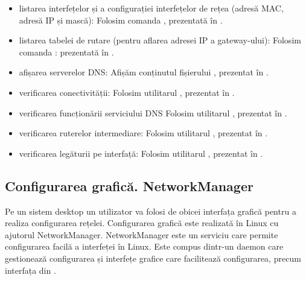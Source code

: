 \begin{itemize}
  \item listarea interfețelor și a configurației interfețelor de rețea (adresă MAC, adresă IP și mască):
    Folosim comanda , prezentată în .
  \item listarea tabelei de rutare (pentru aflarea adresei IP a gateway-ului):
    Folosim comanda : prezentată în .
  \item afișarea serverelor DNS:
    Afișăm conținutul fișierului , prezentat în .
  \item verificarea conectivității:
    Folosim utilitarul , prezentat în .
  \item verificarea funcționării serviciului DNS
    Folosim utilitarul , prezentat în .
  \item verificarea ruterelor intermediare:
    Folosim utilitarul , prezentat în .
  \item verificarea legăturii pe interfață:
    Folosim utilitarul , prezentat în .
\end{itemize}

\subsection{Configurarea grafică. NetworkManager}
\label{sec:net:linux-config:gui}

Pe un sistem desktop un utilizator va folosi de obicei interfața grafică pentru a realiza configurarea rețelei.
Configurarea grafică este realizată în Linux cu ajutorul NetworkManager.
NetworkManager este un serviciu care permite configurarea facilă a interfeței în Linux.
Este compus dintr-un daemon care gestionează configurarea și interfețe grafice care facilitează configurarea, precum interfața din .

